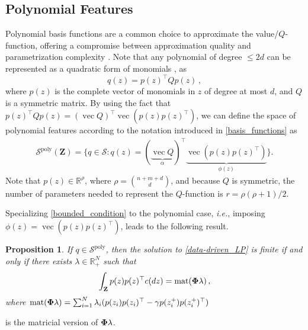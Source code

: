 \documentclass[journal,twoside,web]{ieeecolor}
\newtheorem{prop}{Proposition}
\newcommand{\Sc}{\mathcal{S}}
\newcommand{\Zb}{\mathbf{Z}}
\DeclareMathOperator{\vect}{vec}
\DeclareMathOperator{\mat}{mat}
\begin{document}
\subsection{Polynomial Features}

Polynomial basis functions are a common choice to approximate the value/$Q$-function, offering a compromise between approximation quality and parametrization complexity \cite{SuttonRLanIntroduction, SummersSumofSquares}. Note that any polynomial of degree $\le 2d$ can be represented as a quadratic form of monomials \cite{LasserrePoly}, as 
\begin{equation*}
    q(z) = p(z)^\top Qp(z)\,,
\end{equation*}
%
where $p(z)$ is the complete vector of monomials in $z$ of degree at most $d$, and $Q$ is a symmetric matrix. By using the fact that $p(z)^\top Q p(z) = (\vect Q)^\top \vect(p(z)p(z)^\top)$, we can define the space of polynomial features according to the notation introduced in \eqref{basis_functions} as
%
\begin{equation*}
	\begin{aligned}
		\Sc^{\text{poly}} (\Zb) =  \{ q\in\Sc : q(z) = (\underbrace{\vect Q}_{\alpha})^\top \underbrace{\vect(p(z)p(z)^\top)}_{\phi(z)} \}.
	\end{aligned}
\end{equation*} 
%
Note that $p(z) \in \mathbb{R}^\rho$, where $\rho=\binom{n+m+d}{d}$, and because $Q$ is symmetric, the number of parameters needed to represent the $Q$-function is $r=\rho(\rho+1)/2$.

Specializing \eqref{bounded_condition} to the polynomial case, \textit{i.e.}, imposing $\phi(z)=\vect(p(z)p(z)^\top)$, leads to the following result. 
%
\begin{prop}\label{prop1}
    If $q\in\Sc^{\text{poly}}$, then the solution to \eqref{data-driven_LP} is finite if and only if there exists $\lambda\in\mathbb{R}^{N}_+$ such that
	\begin{equation} \label{nec_condition}
    \int_{\Zb} p(z)p(z)^\top c(dz) = \mat (\bold \Phi \lambda)\,, 
	\end{equation}
    where $\mat (\bold \Phi \lambda)=\sum_{i=1}^{N} \lambda_i (p(z_i)p(z_i)^\top -\gamma p(z_i^+)p(z_i^+)^\top)$
\end{prop}
is the matricial version of $\bold \Phi \lambda$.
\end{document}
